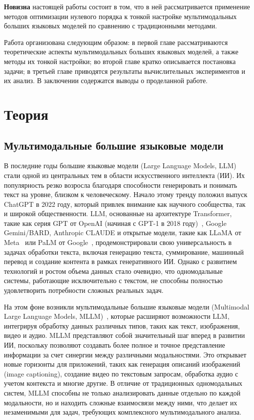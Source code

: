 \documentclass[LI,KR]{HSEUniversity}
\begin{document}
\textbf{Новизна} настоящей работы состоит в том, что в ней рассматривается применение методов оптимизации нулевого порядка к тонкой настройке мультимодальных больших языковых моделей
по сравнению с традиционными методами.


Работа организована следующим образом:
в первой главе рассматриваются теоретические аспекты мультимодальных больших языковых моделей, а также методы их тонкой настройки;
во второй главе кратко описывается постановка задачи;
в третьей главе приводятся результаты вычислительных экспериментов и их анализ.
В заключении содержатся выводы о проделанной работе.

\chapter{Теория}

\section{Мультимодальные большие языковые модели}

В последние годы большие языковые модели (Large Language Models, LLM) стали одной из центральных тем в области искусственного интеллекта (ИИ).
Их популярность резко возросла благодаря способности генерировать и понимать текст на уровне, близком к человеческому.
Начало этому тренду положил выпуск ChatGPT в 2022 году, который привлек внимание как научного сообщества, так и широкой общественности.
LLM, основанные на архитектуре Transformer, такие как серия GPT от OpenAI (начиная с GPT-1 в 2018 году)~\cite{gpt3}, Google Gemini/BARD, Anthropic CLAUDE и открытые модели,
такие как LLaMA от Meta~\cite{llava} или PaLM от Google~\cite{palm}, продемонстрировали свою универсальность в задачах обработки текста, включая генерацию текста, суммирование, машинный перевод и создание контента в рамках генеративного ИИ.
Однако с развитием технологий и ростом объема данных стало очевидно, что одномодальные системы, работающие исключительно с текстом, не способны полностью удовлетворить потребности сложных реальных задач.

На этом фоне возникли мультимодальные большие языковые модели (Multimodal Large Language Models, MLLM)~\cite{mllm-review}, которые расширяют возможности LLM, интегрируя обработку данных различных типов, таких как текст, изображения, видео и аудио.
MLLM представляют собой значительный шаг вперед в развитии ИИ, поскольку позволяют создавать более полное и точное представление информации за счет синергии между различными модальностями.
Это открывает новые горизонты для приложений, таких как генерация описаний изображений (image captioning), создание видео по текстовым запросам, обработка аудио с учетом контекста и многие другие.
В отличие от традиционных одномодальных систем, MLLM способны не только анализировать данные отдельно по каждой модальности, но и находить сложные взаимосвязи между ними, что делает их незаменимыми для задач, требующих комплексного мультимодального анализа.
\end{document}
